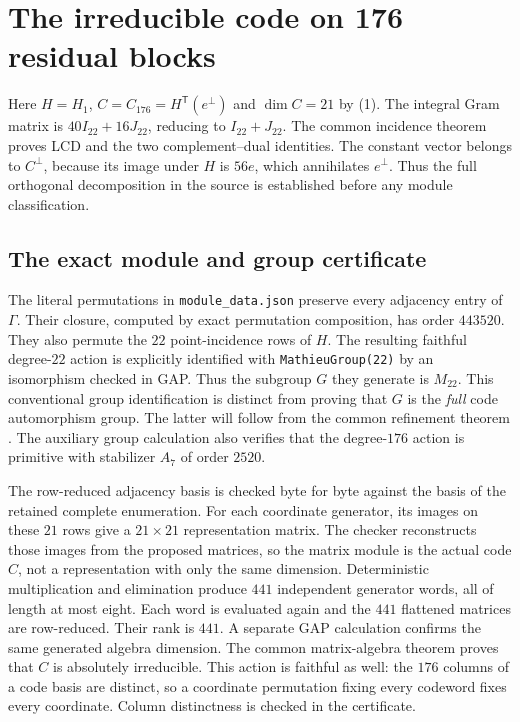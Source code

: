 \section{The irreducible code on 176 residual blocks}
Here $H=H_1$, $C=C_{176}=H^{\mathsf T}(e^\perp)$ and $\dim C=21$ by (1).
The integral Gram matrix is $40I_{22}+16J_{22}$, reducing to $I_{22}+J_{22}$.
The common incidence theorem proves LCD and the two complement--dual
identities. The constant vector belongs to $C^\perp$, because its image
under $H$ is $56e$, which annihilates $e^\perp$. Thus the full orthogonal
decomposition in the source is established before any module classification.

\subsection{The exact module and group certificate}
The literal permutations in \texttt{module\_data.json} preserve every
adjacency entry of $\Gamma$. Their closure, computed by exact permutation
composition, has order $443520$. They also permute the $22$ point-incidence
rows of $H$. The resulting faithful degree-$22$ action is explicitly
identified with \texttt{MathieuGroup(22)} by an isomorphism checked in GAP.
Thus the subgroup $G$ they generate is $M_{22}$. This conventional group
identification is distinct from proving that $G$ is the \emph{full} code
automorphism group. The latter will follow from the common refinement theorem \cite[Theorem~6.4]{U}.
The auxiliary group calculation also verifies that the degree-$176$ action
is primitive with stabilizer $A_7$ of order $2520$.

The row-reduced adjacency basis is checked byte for byte against the basis
of the retained complete enumeration. For each coordinate generator, its
images on these $21$ rows give a $21\times21$ representation matrix.
The checker reconstructs those images from the proposed matrices, so the
matrix module is the actual code $C$, not a representation with only the
same dimension. Deterministic multiplication and elimination produce
$441$ independent generator words, all of length at most eight. Each word
is evaluated again and the $441$ flattened matrices are row-reduced.
Their rank is $441$. A separate GAP calculation confirms the same generated
algebra dimension. The common matrix-algebra theorem \cite[Theorem~6.2]{U} proves that $C$ is absolutely
irreducible. This action is faithful as well: the $176$ columns of a code
basis are distinct, so a coordinate permutation fixing every codeword
fixes every coordinate. Column distinctness is checked in the certificate.

